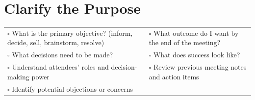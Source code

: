 
\section{Clarify the Purpose}
\label{sec:purpose}

\begin{tabular}{p{9cm} p{8cm}}
$\square$ What is the primary objective? (inform, decide, sell, brainstorm, resolve) & $\square$ What outcome do I want by the end of the meeting? \\ 
$\square$ What decisions need to be made? & $\square$ What does success look like? \\ 
$\square$ Understand attendees’ roles and decision-making power & $\square$ Review previous meeting notes and action items \\
$\square$ Identify potential objections or concerns & \\
\end{tabular}

